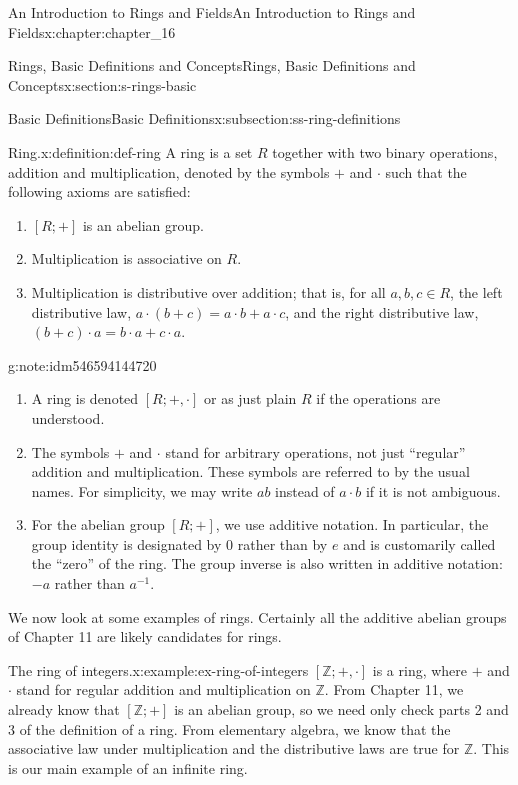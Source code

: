 \documentclass[oneside,10pt,]{book}
\numberwithin{equation}{section}
\begin{document}
\begin{chapterptx}{An Introduction to Rings and Fields}{}{An Introduction to Rings and Fields}{}{}{x:chapter:chapter_16}
\begin{sectionptx}{Rings, Basic Definitions and Concepts}{}{Rings, Basic Definitions and Concepts}{}{}{x:section:s-rings-basic}
\begin{subsectionptx}{Basic Definitions}{}{Basic Definitions}{}{}{x:subsection:ss-ring-definitions}
\begin{definition}{Ring.}{x:definition:def-ring}
%
\label{g:notation:idm546594153200}%
A ring is a set \(R\) together with two binary operations, addition and multiplication, denoted by the symbols \(+\) and \(\cdot\) such that the following axioms are satisfied:%
\begin{enumerate}[label=(\arabic*)]
\item{}\([R; +]\) is an abelian group.%
\item{}Multiplication is associative on \(R\).%
\item{}Multiplication is distributive over addition; that is, for all \(a, b, c \in R\), the left distributive law, \(a \cdot (b + c) = a \cdot b + a\cdot c\), and the right distributive law, \((b + c)\cdot a = b\cdot a + c\cdot a\).%
\end{enumerate}
%
\end{definition}
\begin{note}{}{g:note:idm546594144720}%
%
\begin{enumerate}[label=(\arabic*)]
\item{}A ring is denoted  \([R;+, \cdot ]\) or as just plain \(R\) if the operations are understood.%
\item{}The symbols \(+\) and \(\cdot\) stand for arbitrary operations, not just ``regular'' addition and multiplication. These symbols are referred to by the usual names. For simplicity, we may write \(a b\) instead of \(a\cdot b\) if it is not ambiguous.%
\item{}For the abelian group \([R; +]\), we use additive notation. In particular, the group identity is designated by 0 rather than by \(e\) and is customarily called the ``zero'' of the ring. The group inverse is also written in additive notation: \(-a\) rather than \(a^{-1}\).%
\end{enumerate}
%
\end{note}
We now look at some examples of rings. Certainly all the additive abelian groups of Chapter 11 are likely candidates for rings.%
\begin{example}{The ring of integers.}{x:example:ex-ring-of-integers}%
\([\mathbb{Z}; +, \cdot ]\) is a ring, where \(+\) and \(\cdot\) stand for regular addition and multiplication on \(\mathbb{Z}\). From Chapter 11, we already know that \([\mathbb{Z}; +]\) is an abelian group, so we need only check parts 2 and 3 of the definition of a ring. From elementary algebra, we know that the associative law under multiplication and the distributive laws are true for \(\mathbb{Z}\). This is our main example of an infinite ring.%
\end{example}

\end{subsectionptx}
\end{sectionptx}
\end{chapterptx}
\end{document}
